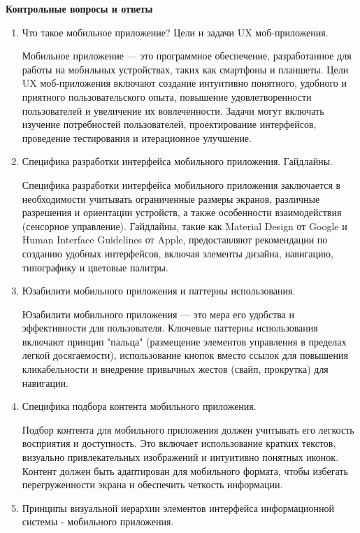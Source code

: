 \textbf{Контрольные вопросы и ответы}

\begin{enumerate}
    \item Что такое мобильное приложение? Цели и задачи UX моб-приложения.

    Мобильное приложение — это программное обеспечение, разработанное для работы на мобильных устройствах, таких как смартфоны и планшеты. Цели UX моб-приложения включают создание интуитивно понятного, удобного и приятного пользовательского опыта, повышение удовлетворенности пользователей и увеличение их вовлеченности. Задачи могут включать изучение потребностей пользователей, проектирование интерфейсов, проведение тестирования и итерационное улучшение.

    \item Специфика разработки интерфейса мобильного приложения. Гайдлайны.

    Специфика разработки интерфейса мобильного приложения заключается в необходимости учитывать ограниченные размеры экранов, различные разрешения и ориентации устройств, а также особенности взаимодействия (сенсорное управление). Гайдлайны, такие как Material Design от Google и Human Interface Guidelines от Apple, предоставляют рекомендации по созданию удобных интерфейсов, включая элементы дизайна, навигацию, типографику и цветовые палитры.

    \item Юзабилити мобильного приложения и паттерны использования.

    Юзабилити мобильного приложения — это мера его удобства и эффективности для пользователя. Ключевые паттерны использования включают принцип "пальца" (размещение элементов управления в пределах легкой досягаемости), использование кнопок вместо ссылок для повышения кликабельности и внедрение привычных жестов (свайп, прокрутка) для навигации.

    \item Специфика подбора контента мобильного приложения.

    Подбор контента для мобильного приложения должен учитывать его легкость восприятия и доступность. Это включает использование кратких текстов, визуально привлекательных изображений и интуитивно понятных иконок. Контент должен быть адаптирован для мобильного формата, чтобы избегать перегруженности экрана и обеспечить четкость информации.

    \item Принципы визуальной иерархии элементов интерфейса информационной системы - мобильного приложения.


\end{enumerate}
